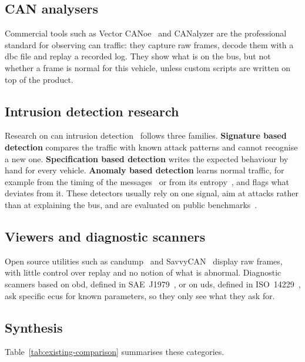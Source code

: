 \subsection{CAN analysers}

Commercial tools such as Vector CANoe~\cite{vector_canoe} and CANalyzer are the professional standard for observing \gls{can} traffic: they capture raw frames, decode them with a \gls{dbc} file and replay a recorded log. They show what is on the bus, but not whether a frame is normal for this vehicle, unless custom scripts are written on top of the product.

\subsection{Intrusion detection research}

Research on \gls{can} intrusion detection~\cite{lokman2019intrusion} follows three families. \textbf{Signature based detection} compares the traffic with known attack patterns and cannot recognise a new one. \textbf{Specification based detection} writes the expected behaviour by hand for every vehicle. \textbf{Anomaly based detection} learns normal traffic, for example from the timing of the messages~\cite{song2016intrusion,cho2016fingerprinting} or from its entropy~\cite{muter2011entropy}, and flags what deviates from it. These detectors usually rely on one signal, aim at attacks rather than at explaining the bus, and are evaluated on public benchmarks~\cite{seo2018gids,verma2020road}.

\subsection{Viewers and diagnostic scanners}

Open source utilities such as candump~\cite{canutils} and SavvyCAN~\cite{savvycan} display raw frames, with little control over replay and no notion of what is abnormal. Diagnostic scanners based on \gls{obd}, defined in SAE~J1979~\cite{sae_j1979}, or on \gls{uds}, defined in ISO~14229~\cite{iso14229}, ask specific \glspl{ecu} for known parameters, so they only see what they ask for.

\subsection{Synthesis}

Table~\ref{tab:existing-comparison} summarises these categories.

